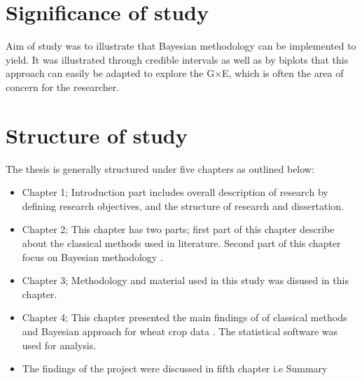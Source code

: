\section{Significance of study}
Aim of study was to illustrate that Bayesian methodology can be implemented to yield. It was illustrated through credible intervals as well as by biplots that this approach can easily be adapted to explore the G$\times$E, which is often the area of concern for the researcher. 
\section{Structure of study}
The thesis is generally structured under five chapters as outlined below:
\begin{itemize}
	
\item Chapter 1; Introduction part includes overall description of research by defining research
objectives, and the structure of research and dissertation. 
\item Chapter 2; This chapter has two parts; first part of this chapter describe about the classical methods used in literature. Second part of this chapter focus on Bayesian methodology . \item Chapter 3; Methodology and material used in this study was disused in this chapter. 
\item Chapter 4; This chapter presented the main findings of  of classical methods and Bayesian approach for wheat crop data . The statistical software \cite{R2015} was used for analysis.
\item The findings of the project were discussed in fifth chapter i.e Summary        
\end{itemize}